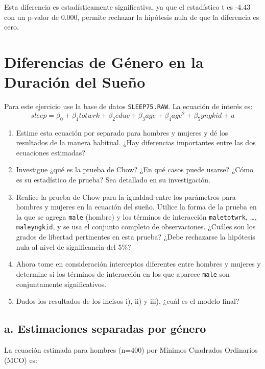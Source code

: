 \documentclass[12pt]{article}
\begin{document}
Esta diferencia es estadísticamente significativa, ya que el estadístico t es -4.43 con un p-valor de 0.000, permite rechazar la hipótesis nula de que la diferencia es cero.

\section{Diferencias de Género en la Duración del Sueño}
Para este ejercicio use la base de datos \texttt{SLEEP75.RAW}. 
La ecuación de interés es:
\[
sleep = \beta_{0} + \beta_{1}totwrk + \beta_{2}educ + \beta_{3}age + \beta_{4}age^{2} + \beta_{5}yngkid + u
\]

\begin{enumerate}[label=\alph*)]
    \item Estime esta ecuación por separado para hombres y mujeres y dé los resultados de la manera habitual. 
    ¿Hay diferencias importantes entre las dos ecuaciones estimadas?

    \item Investigue ¿qué es la prueba de Chow? ¿En qué casos puede usarse? 
    ¿Cómo es su estadístico de prueba? Sea detallado en su investigación.

    \item Realice la prueba de Chow para la igualdad entre los parámetros para hombres y mujeres en la ecuación del sueño. 
    Utilice la forma de la prueba en la que se agrega \texttt{male} (hombre) y los términos de interacción 
    \texttt{maletotwrk}, \ldots, \texttt{maleyngkid}, y se usa el conjunto completo de observaciones. 
    ¿Cuáles son los grados de libertad pertinentes en esta prueba? 
    ¿Debe rechazarse la hipótesis nula al nivel de significancia del 5\%?

    \item Ahora tome en consideración interceptos diferentes entre hombres y mujeres y determine si los términos de interacción en los que aparece \texttt{male} son conjuntamente significativos.

    \item Dados los resultados de los incisos i), ii) y iii), ¿cuál es el modelo final?
\end{enumerate}

\subsection*{a. Estimaciones separadas por género}

La ecuación estimada para hombres (n=400) por Mínimos Cuadrados Ordinarios (MCO) es:
\end{document}
